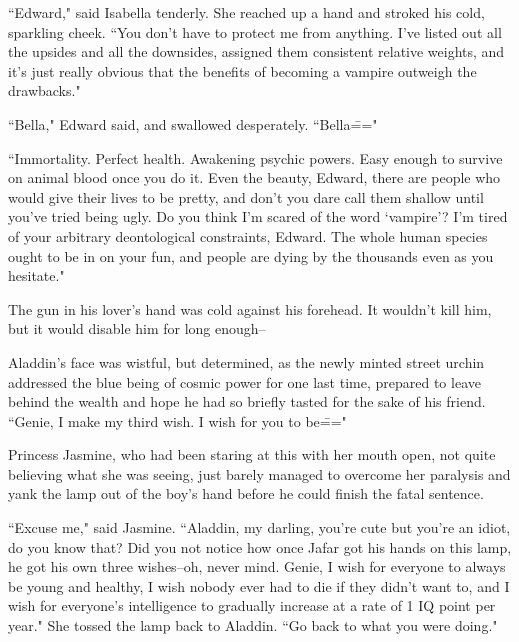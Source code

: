 ``Edward," said Isabella tenderly. She reached up a hand and stroked his cold, sparkling cheek. ``You don't have to protect me from anything. I've listed out all the upsides and all the downsides, assigned them consistent relative weights, and it's just really obvious that the benefits of becoming a vampire outweigh the drawbacks."

``Bella," Edward said, and swallowed desperately. ``Bella\==="

``Immortality. Perfect health. Awakening psychic powers. Easy enough to survive on animal blood once you do it. Even the beauty, Edward, there are people who would give their lives to be pretty, and don't you dare call them shallow until you've tried being ugly. Do you think I'm scared of the word `vampire'? I'm tired of your arbitrary deontological constraints, Edward. The whole human species ought to be in on your fun, and people are dying by the thousands even as you hesitate."

The gun in his lover's hand was cold against his forehead. It wouldn't kill him, but it would disable him for long enough\---


Aladdin's face was wistful, but determined, as the newly minted street urchin addressed the blue being of cosmic power for one last time, prepared to leave behind the wealth and hope he had so briefly tasted for the sake of his friend. ``Genie, I make my third wish. I wish for you to be\==="

Princess Jasmine, who had been staring at this with her mouth open, not quite believing what she was seeing, just barely managed to overcome her paralysis and yank the lamp out of the boy's hand before he could finish the fatal sentence.

``Excuse me," said Jasmine. ``Aladdin, my darling, you're cute but you're an idiot, do you know that? Did you not notice how once Jafar got his hands on this lamp, he got his own three wishes\---oh, never mind. Genie, I wish for everyone to always be young and healthy, I wish nobody ever had to die if they didn't want to, and I wish for everyone's intelligence to gradually increase at a rate of 1 IQ point per year." She tossed the lamp back to Aladdin. ``Go back to what you were doing."

%

